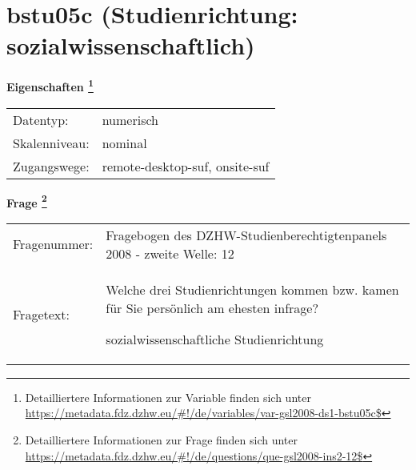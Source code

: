 
    \setcounter{footnote}{0}

    \vspace*{-1.8cm}
	\section{bstu05c (Studienrichtung: sozialwissenschaftlich)}
	\label{section:bstu05c}



    \vspace*{0.5cm}
    \noindent\textbf{Eigenschaften
	\footnote{Detailliertere Informationen zur Variable finden sich unter
		\url{https://metadata.fdz.dzhw.eu/\#!/de/variables/var-gsl2008-ds1-bstu05c$}}}\\
	\begin{tabularx}{\hsize}{@{}lX}
	Datentyp: & numerisch \\
	Skalenniveau: & nominal \\
	Zugangswege: &
	  remote-desktop-suf, 
	  onsite-suf
 \\
    \end{tabularx}



				\vspace*{0.5cm}
                \noindent\textbf{Frage
	                \footnote{Detailliertere Informationen zur Frage finden sich unter
		              \url{https://metadata.fdz.dzhw.eu/\#!/de/questions/que-gsl2008-ins2-12$}}}\\
				\begin{tabularx}{\hsize}{@{}lX}
					Fragenummer: &
					  Fragebogen des DZHW-Studienberechtigtenpanels 2008 - zweite Welle:
					  12
 \\
					Fragetext: & Welche drei Studienrichtungen kommen bzw. kamen für Sie persönlich am ehesten infrage?\par  sozialwissenschaftliche Studienrichtung \\
				\end{tabularx}





